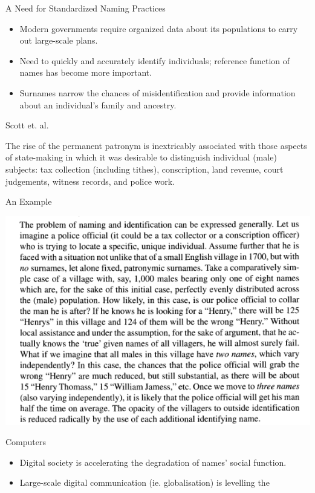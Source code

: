 \documentclass{beamer}
\begin{document}
\begin{frame}{A Need for Standardized Naming Practices}
\begin{itemize}
\item Modern governments require organized data about its populations to carry
out large-scale plans.
\item Need to quickly and accurately identify individuals; reference function of
names has become more important.
\item Surnames narrow the chances of misidentification and provide information
about an individual's family and ancestry.
\end{itemize}
\end{frame}

\begin{frame}{Scott et. al.}
\begin{aquote}{\textcite{scott02}}
The rise of the permanent patronym is inextricably associated with those aspects
of state-making in which it was desirable to distinguish individual (male)
subjects: tax collection (including tithes), conscription, land revenue, court
judgements, witness records, and police work.
\end{aquote}
\end{frame}

\begin{frame}{An Example}
\begin{center}
\includegraphics[scale=0.4]{subtex/scott9.png}
\end{center}
\end{frame}

\begin{frame}{Computers}
\begin{itemize}
\item Digital society is accelerating the degradation of names' social
function.
\item Large-scale digital communication (ie. globalisation) is levelling the
\end{itemize}
\end{frame}
\end{document}
